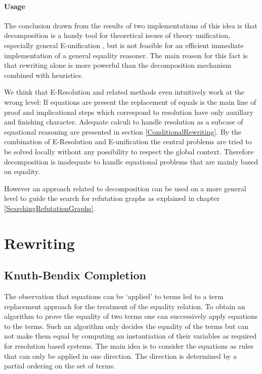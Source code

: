 \paragraph{Usage}

The conclusion drawn from the results of two implementations of this idea is
that decomposition is a handy tool for theoretical issues of theory
unification, especially general E-unification
\cite{GaSn89}, but is not feasible for an
efficient immediate implementation of a general equality reasoner. The
main reason for this fact is that 
rewriting alone is more powerful than the decomposition mechanism
combined with heuristics. 

We think that E-Resolution and related methods even intuitively work 
at the wrong level:
If equations are present the replacement of equals is the main line of proof and 
implicational steps which correspond to resolution have only auxillary and 
finishing character. Adequate calculi to handle resolution as a subcase 
of equational reasoning are presented in section \ref{ConditionalRewriting}. 
By the combination of E-Resolution and
E-unification the central problems are tried to 
be solved locally without any possibility to respect the global context.
Therefore decomposition is inadequate to handle equational problems that
are mainly based on equality. \label{DecDisc2}

However an approach related to decomposition can be used on a more general level to guide the
search for refutation graphs as explained in chapter
\ref{SearchingRefutationGraphs}.

\section{Rewriting}

\subsection{Knuth-Bendix Completion}
\label{KnuthBendixCompletion}

The observation that equations can be `applied'
to terms led to a term replacement 
approach for the treatment of the equality relation.
To obtain an algorithm to prove the equality of two terms
one can successively apply equations to the
terms. Such an algorithm only decides the equality of the terms but
can not make them equal by computing an instantiation of
their variables as required for resolution based systems.
The main idea is to consider the equations as rules that can only be
applied in one direction. The direction is determined by a partial
ordering on the set of terms.

